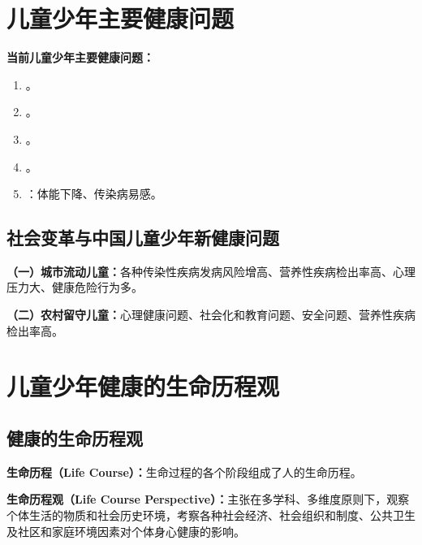 \section{儿童少年主要健康问题}
\label{sec:health-problems}

\begin{keybox}
\textbf{当前儿童少年主要健康问题：}

\begin{enumerate}[leftmargin=*]
    \item {}。
    \item {}。
    \item {}。
    \item {}。
    \item {}：体能下降、传染病易感。
\end{enumerate}
\end{keybox}

\subsection{社会变革与中国儿童少年新健康问题}

\begin{defbox}
\textbf{（一）城市流动儿童：}各种传染性疾病发病风险增高、营养性疾病检出率高、心理压力大、健康危险行为多。

\textbf{（二）农村留守儿童：}心理健康问题、社会化和教育问题、安全问题、营养性疾病检出率高。
\end{defbox}

\section{儿童少年健康的生命历程观}
\label{sec:life-course}

\subsection{健康的生命历程观}

\begin{keybox}
\textbf{生命历程（Life Course）：}生命过程的各个阶段组成了人的生命历程。

\textbf{生命历程观（Life Course Perspective）：}主张在多学科、多维度原则下，观察个体生活的物质和社会历史环境，考察各种社会经济、社会组织和制度、公共卫生及社区和家庭环境因素对个体身心健康的影响。
\end{keybox}

